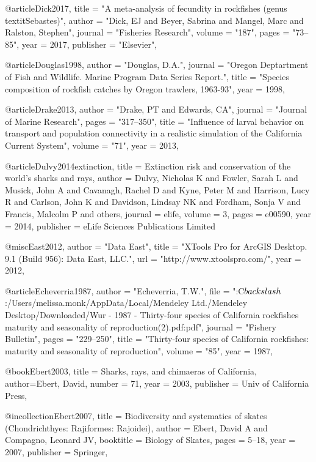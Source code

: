 @article{Dick2017,
    title = "{A meta-analysis of fecundity in rockfishes (genus \\textit{{{Sebastes}}})}",
    author = "{Dick, EJ and Beyer, Sabrina and Mangel, Marc and Ralston, Stephen}",
    journal = "{Fisheries Research}",
    volume = "{187}",
    pages = "{73--85}",
    year = 2017,
    publisher = "{Elsevier}",
}

@article{Douglas1998,
    author = "{Douglas, D.A.}",
    journal = "{Oregon Deptartment of Fish and Wildlife. Marine Program Data Series Report.}",
    title = "{{Species composition of rockfish catches by Oregon trawlers, 1963-93}}",
    year = 1998,
}

@article{Drake2013,
    author = "{Drake, PT and Edwards, CA}",
    journal = "{Journal of Marine Research}",
    pages = "{317--350}",
    title = "{{Influence of larval behavior on transport and population connectivity in a realistic simulation of the California Current System}}",
    volume = "{71}",
    year = 2013,
}

@article{Dulvy2014extinction,
  title = {Extinction risk and conservation of the world’s sharks and rays},
  author = {Dulvy, Nicholas K and Fowler, Sarah L and Musick, John A and Cavanagh, Rachel D and Kyne, Peter M and Harrison, Lucy R and Carlson, John K and Davidson, Lindsay NK and Fordham, Sonja V and Francis, Malcolm P and others},
  journal = {elife},
  volume = {3},
  pages = {e00590},
  year = 2014,
  publisher = {eLife Sciences Publications Limited}
}

@misc{East2012,
    author = "{{Data East}}",
    title = "{{XTools Pro for ArcGIS Desktop. 9.1 (Build 956): Data East, LLC.}}",
    url = "{http://www.xtoolspro.com/}",
    year = 2012,
}

@article{Echeverria1987,
    author = "{Echeverria, T.W.}",
    file = "{:C$\\backslash$:/Users/melissa.monk/AppData/Local/Mendeley Ltd./Mendeley Desktop/Downloaded/Wur - 1987 - Thirty-four species of California rockfishes maturity and seasonality of reproduction(2).pdf:pdf}",
    journal = "{Fishery Bulletin}",
    pages = "{229--250}",
    title = "{{Thirty-four species of California rockfishes: maturity and seasonality of reproduction}}",
    volume = "{85}",
    year = 1987,
}

@book{Ebert2003,
  title = {Sharks, rays, and chimaeras of California},
  author={Ebert, David},
  number = {71},
  year = 2003,
  publisher = {Univ of California Press},
}


@incollection{Ebert2007,
  title  =  {Biodiversity and systematics of skates (Chondrichthyes: Rajiformes: Rajoidei)},
  author  =  {Ebert, David A and Compagno, Leonard JV},
  booktitle  =  {Biology of Skates},
  pages  =  {5--18},
  year  =  2007,
  publisher  =  {Springer},
}

